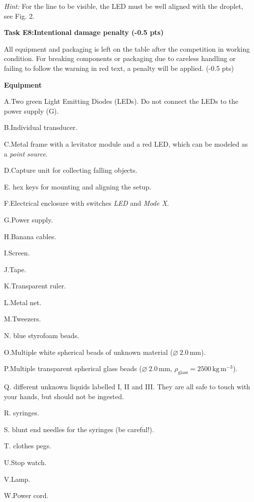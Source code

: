 \textit{Hint:} For the line to be visible, the LED must be well aligned with
the droplet, see Fig. 2.

\textbf{Task E8:\quad Intentional damage penalty (-0.5 pts)}

All equipment and packaging is left on the table after the competition in
working condition. For breaking components or packaging due to careless
handling or failing to follow the warning in red text, a penalty will be
applied. (-0.5 pts)

\textbf{Equipment}

A.\quad Two green Light Emitting Diodes (LEDs). Do not connect the LEDs to the
power supply (G).

B.\quad Individual transducer.

C.\quad Metal frame with a levitator module and a red LED, which can be modeled
as a \textit{point source}.

D.\quad Capture unit for collecting falling objects.

E. hex keys for mounting and aligning the setup.

F.\quad Electrical enclosure with switches \textit{LED} and \textit{Mode X}.

G.\quad Power supply.

H.\quad Banana cables.

I.\quad Screen.

J.\quad Tape.

K.\quad Transparent ruler.

L.\quad Metal net.

M.\quad Tweezers.

N. blue styrofoam beads.

O.\quad Multiple white spherical beads of unknown material
($\varnothing\ 2.0\,\mathrm{mm}$).

P.\quad Multiple transparent spherical glass beads
($\varnothing\ 2.0\,\mathrm{mm}$, $\rho_\mathrm{glass} = 2500\,\mathrm{kg\,m^{-3}}$).

Q. different unknown liquids labelled I, II and III. They are all safe
to touch with your hands, but should not be ingested.

R. syringes.

S. blunt end needles for the syringes (be careful!).

T. clothes pegs.

U.\quad Stop watch.

V.\quad Lamp.

W.\quad Power cord.

